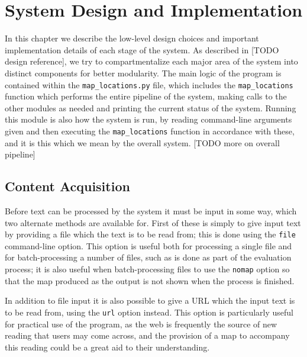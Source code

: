 \documentclass[12pt, a4paper]{report}
\begin{document}
\chapter{System Design and Implementation}

In this chapter we describe the low-level design choices and important implementation details of each stage of the system. As described in [TODO design reference], we try to compartmentalize each major area of the system into distinct components for better modularity. The main logic of the program is contained within the \verb#map_locations.py# file, which includes the \verb#map_locations# function which performs the entire pipeline of the system, making calls to the other modules as needed and printing the current status of the system. Running this module is also how the system is run, by reading command-line arguments given and then executing the \verb#map_locations# function in accordance with these, and it is this which we mean by the overall system. [TODO more on overall pipeline]

\section{Content Acquisition}

Before text can be processed by the system it must be input in some way, which two alternate methods are available for. First of these is simply to give input text by providing a file which the text is to be read from; this is done using the \verb#file# command-line option. This option is useful both for processing a single file and for batch-processing a number of files, such as is done as part of the evaluation process; it is also useful when batch-processing files to use the \verb#nomap# option so that the map produced as the output is not shown when the process is finished.

In addition to file input it is also possible to give a URL which the input text is to be read from, using the \verb#url# option instead. This option is particularly useful for practical use of the program, as the web is frequently the source of new reading that users may come across, and the provision of a map to accompany this reading could be a great aid to their understanding.
\end{document}
